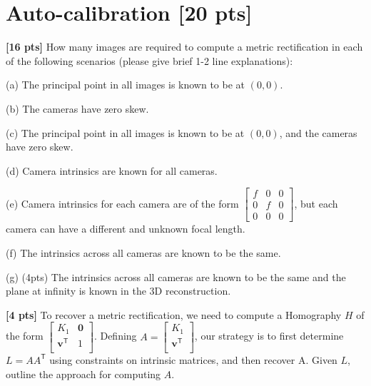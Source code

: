 \documentclass[11pt,addpoints,answers]{exam}
\numberwithin{equation}{section} %
\numberwithin{figure}{section} %
\numberwithin{table}{section} %
\begin{document}
\section{Auto-calibration [20 pts]}
\begin{questions}

\question \textbf{[16 pts]} How many images are required to compute a metric rectification in each of the following scenarios (please give brief 1-2 line explanations):

(a) The principal point in all images is known to be at $(0,0)$.

(b) The cameras have zero skew.

(c) The principal point in all images is known to be at $(0,0)$, and the cameras have zero skew.

(d)  Camera intrinsics are known for all cameras.

(e) Camera intrinsics for each camera are of the form
$
\begin{bmatrix}
f & 0 & 0 \\
0 & f & 0 \\
0 & 0 & 0
\end{bmatrix}$, but each camera can have a different and unknown focal length.

(f) The intrinsics across all cameras are known to be the same.

(g) (4pts) The intrinsics across all cameras are known to be the same and the plane at infinity is known in the 3D reconstruction.

\begin{tcolorbox}[fit,height=14cm, width=\textwidth, blank, borderline={0.5pt}{-2pt},halign=left, valign=center, nobeforeafter]

\end{tcolorbox}

\newpage

\question \textbf{[4 pts]} To recover a metric rectification, we need to compute a Homography $H$ of the form $\begin{bmatrix}
K_1 & \mathbf{0} \\
\mathbf{v}^{\mathsf{T}} & 1 \\
\end{bmatrix}$. Defining $A=\begin{bmatrix}
K_1 \\
\mathbf{v}^{\mathsf{T}} \\
\end{bmatrix}$, our strategy is to first determine $L=AA^{\mathsf{T}}$ using constraints on intrinsic matrices, and then recover A. Given $L$, outline the approach for computing $A$.


\end{questions}
\end{document}
